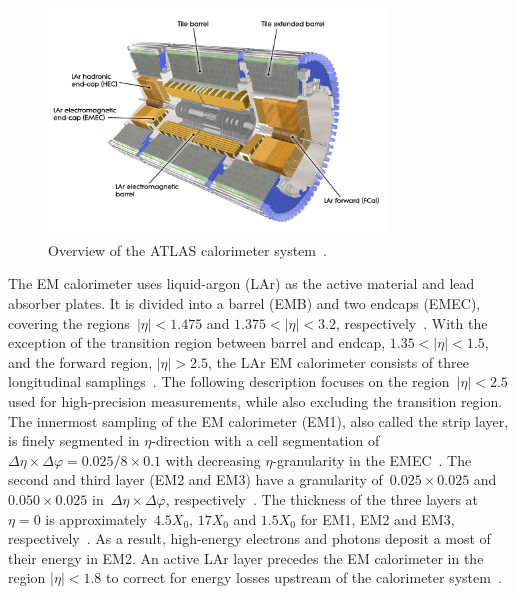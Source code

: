 \begin{figure}[htb]
  \centering
  \includegraphics[width=0.8\textwidth]{./figures/atlas/calorimeter.jpg}
  \caption[Overview of the ATLAS calorimeter system]{Overview of the ATLAS
    calorimeter system~\cite{calo_fig}.}
  \label{fig:atlas_calo}
\end{figure}

The EM calorimeter uses liquid-argon (LAr) as the active material and lead
absorber plates. It is divided into a barrel (EMB) and two endcaps (EMEC),
covering the regions~$|\eta| < 1.475$ and $1.375 < |\eta| < 3.2$,
respectively~\cite{atlas_detector}. With the exception of the transition region
between barrel and endcap, $1.35 < |\eta| < 1.5$, and the forward region,
$|\eta| > 2.5$, the LAr EM calorimeter consists of three longitudinal
samplings~\cite{atlas_detector}. The following description focuses on the
region~$|\eta| < 2.5$ used for high-precision measurements, while also excluding
the transition region. The innermost sampling of the EM calorimeter (EM1), also
called the strip layer, is finely segmented in $\eta$-direction with a cell
segmentation of~$\Delta\eta \times \Delta\varphi = 0.025/8 \times 0.1$ with
decreasing $\eta$-granularity in the EMEC~\cite{atlas_detector}. The second and
third layer (EM2 and EM3) have a granularity of~$0.025 \times 0.025$
and~$0.050 \times 0.025$ in~$\Delta\eta \times \Delta\varphi$,
respectively~\cite{atlas_detector}. The thickness of the three layers
at~$\eta = 0$ is approximately~$4.5 X_0$, $17 X_0$ and $1.5 X_0$ for EM1, EM2
and EM3, respectively~\cite{atlas_detector}. As a result, high-energy electrons
and photons deposit a most of their energy in EM2. An active LAr layer precedes
the EM calorimeter in the region $|\eta| < 1.8$ to correct for energy losses
upstream of the calorimeter system~\cite{atlas_detector}.

